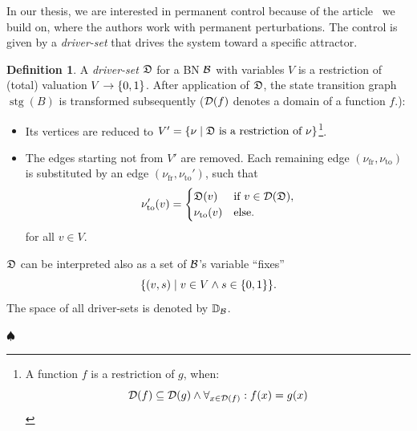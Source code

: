 \documentclass[
	digital, oneside, nosansbold, nocolorbold, nolot, nolof
]{fithesis4}
\theoremstyle{definition}
\newtheorem{definition}{Definition}
\theoremstyle{definition}
\newenvironment{ldefinition}
    {\begin{definition}}
	{\par\hspace{\stretch{1}}$\spadesuit$\hspace{\stretch{1}}
     \par\end{definition}}
\DeclareMathOperator{\stg}{stg}
\DeclarePairedDelimiter{\set}{\{}{\}}
\begin{document}
In our thesis, we are interested in permanent control because of the
article~\cite{infl_max_BN} we build on, where the authors work with permanent
perturbations. The control is given by a \emph{driver-set} that drives the
system toward a specific attractor.

\begin{ldefinition}
A \emph{driver-set} $\mathfrak{D}$ for a BN $\mathcal{B}$ with variables $V$ is a
restriction of (total) valuation $V \to \set{0, 1}$. After application of
$\mathfrak{D}$, the state transition graph $\stg(B)$ is transformed subsequently
($\mathcal{D}(f)$ denotes a domain of a function $f$.):
\begin{itemize}
    \item Its vertices are reduced to $V' = \set{\nu \mid \dset{D} \text{ is
        a restriction of } \nu}$\footnote{A function $f$ is a
        restriction of $g$, when:
        \[
        \mathcal{D}(f) \subseteq \mathcal{D}(g) \land \forall_{x \in \mathcal{D}(f)} : f(x) = g(x)
        \]}.
    \item The edges starting not from $V'$ are removed.
        Each remaining edge $(\nu_{\text{fr}}, \nu_{\text{to}})$ is
        substituted by an edge $(\nu_{\text{fr}}, \nu_{\text{to}}')$,
        such that
        \[
            \nu_{\text{to}}'(v) =
            \begin{cases}
                \mathfrak{D}(v) & \text{if } v \in \mathcal{D}(\mathfrak{D}),\\
                \nu_{\text{to}}(v) & \text{else}.
            \end{cases}
        \]
        for all $v \in V$.
\end{itemize}

$\mathfrak{D}$ can be interpreted also as a set of $\mathcal{B}$'s variable
\enquote{fixes}
\[
    \set*{(v, s) \mid v \in V \land s \in \set{0, 1}}.
\]
The space of all driver-sets is denoted by $\mathbb{D}_{\mathcal{B}}$.
\end{ldefinition}
\end{document}
